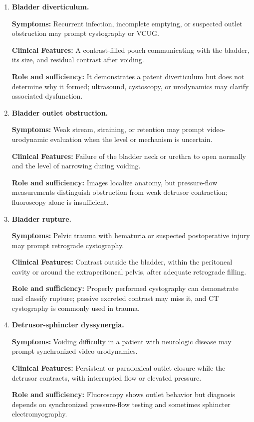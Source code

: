 \begin{enumerate}[leftmargin=*,itemsep=0.45em,topsep=0.4em]
\item \textbf{Bladder diverticulum.}\par\noindent\textbf{Symptoms:} Recurrent infection, incomplete emptying, or suspected outlet obstruction may prompt cystography or VCUG.\par\noindent\textbf{Clinical Features:} A contrast-filled pouch communicating with the bladder, its size, and residual contrast after voiding.\par\noindent\textbf{Role and sufficiency:} It demonstrates a patent diverticulum but does not determine why it formed; ultrasound, cystoscopy, or urodynamics may clarify associated dysfunction.
\item \textbf{Bladder outlet obstruction.}\par\noindent\textbf{Symptoms:} Weak stream, straining, or retention may prompt video-urodynamic evaluation when the level or mechanism is uncertain.\par\noindent\textbf{Clinical Features:} Failure of the bladder neck or urethra to open normally and the level of narrowing during voiding.\par\noindent\textbf{Role and sufficiency:} Images localize anatomy, but pressure-flow measurements distinguish obstruction from weak detrusor contraction; fluoroscopy alone is insufficient.
\item \textbf{Bladder rupture.}\par\noindent\textbf{Symptoms:} Pelvic trauma with hematuria or suspected postoperative injury may prompt retrograde cystography.\par\noindent\textbf{Clinical Features:} Contrast outside the bladder, within the peritoneal cavity or around the extraperitoneal pelvis, after adequate retrograde filling.\par\noindent\textbf{Role and sufficiency:} Properly performed cystography can demonstrate and classify rupture; passive excreted contrast may miss it, and CT cystography is commonly used in trauma.
\item \textbf{Detrusor-sphincter dyssynergia.}\par\noindent\textbf{Symptoms:} Voiding difficulty in a patient with neurologic disease may prompt synchronized video-urodynamics.\par\noindent\textbf{Clinical Features:} Persistent or paradoxical outlet closure while the detrusor contracts, with interrupted flow or elevated pressure.\par\noindent\textbf{Role and sufficiency:} Fluoroscopy shows outlet behavior but diagnosis depends on synchronized pressure-flow testing and sometimes sphincter electromyography.

\end{enumerate}
